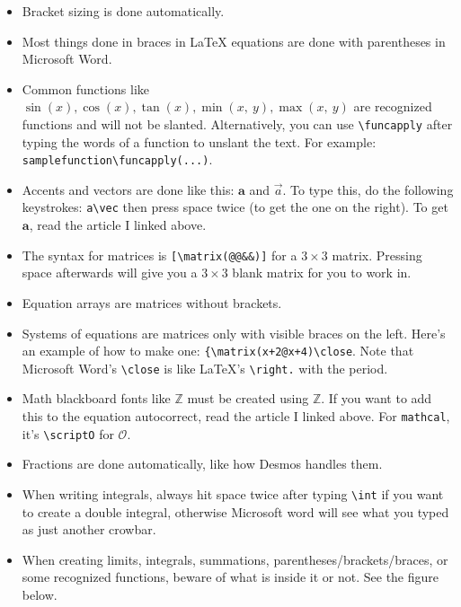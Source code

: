 \documentclass[
]{article}
\theoremstyle{plain}
\theoremstyle{remark}
\theoremstyle{definition}
\begin{document}
\begin{itemize}
\item
  Bracket sizing is done automatically.
\item
  Most things done in braces in LaTeX equations are done with
  parentheses in Microsoft Word.
\item
  Common functions like
  \(\sin(x),\cos(x),\tan(x),\min(x,\ y),\max(x,\ y)\) are recognized
  functions and will not be slanted. Alternatively, you can use
  \texttt{\textbackslash{}funcapply} after typing the words of a
  function to unslant the text. For example:
  \texttt{samplefunction\textbackslash{}funcapply(...)}.
\item
  Accents and vectors are done like this: \(\mathbf{a}\) and
  \(\overrightarrow{a}\). To type this, do the following keystrokes:
  \texttt{a\textbackslash{}vec} then press space twice (to get the one
  on the right). To get \(\mathbf{a}\), read the article I linked
  above.
\item
  The syntax for matrices is
  \texttt{{[}\textbackslash{}matrix(@@\&\&){]}} for a \(3 \times 3\)
  matrix. Pressing space afterwards will give you a \(3 \times 3\) blank
  matrix for you to work in.
\item
  Equation arrays are matrices without brackets.
\item
  Systems of equations are matrices only with visible braces on the
  left. Here's an example of how to make one:
  \texttt{\{\textbackslash{}matrix(x+2@x+4)\textbackslash{}close}. Note
  that Microsoft Word's \texttt{\textbackslash{}close} is like LaTeX's
  \texttt{\textbackslash{}right.} with the period.
\item
  Math blackboard fonts like \(\mathbb{Z}\) must be created using
  \(\mathbb{Z}\). If you want to add this to the equation autocorrect,
  read the article I linked above. For \texttt{mathcal}, it's
  \texttt{\textbackslash{}scriptO} for \(\mathcal{O}\).
\item
  Fractions are done automatically, like how Desmos handles them.
\item
  When writing integrals, always hit space twice after typing
  \texttt{\textbackslash{}int} if you want to create a double integral,
  otherwise Microsoft word will see what you typed as just another
  crowbar.
\item
  When creating limits, integrals, summations,
  parentheses/brackets/braces, or some recognized functions, beware of
  what is inside it or not. See the figure below.
\end{itemize}
\end{document}
